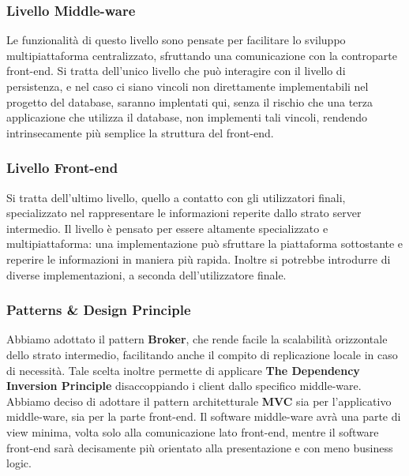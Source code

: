 \documentclass[a4paper]{article}
\begin{document}
\subsubsection{Livello Middle-ware}
Le funzionalità di questo livello sono pensate per facilitare lo sviluppo multipiattaforma centralizzato, sfruttando una comunicazione con la controparte front-end. Si tratta dell'unico livello che può interagire con il livello di persistenza, e nel caso ci siano vincoli non direttamente implementabili nel progetto del database, saranno implentati qui, senza il rischio che una terza applicazione che utilizza il database, non implementi tali vincoli, rendendo intrinsecamente più semplice la struttura del front-end.

\subsubsection{Livello Front-end}
Si tratta dell'ultimo livello, quello a contatto con gli utilizzatori finali, specializzato nel rappresentare le informazioni reperite dallo strato server intermedio. Il livello è pensato per essere altamente specializzato e multipiattaforma: una implementazione può sfruttare la piattaforma sottostante e reperire le informazioni in maniera più rapida. Inoltre si potrebbe introdurre di diverse implementazioni, a seconda dell'utilizzatore finale.\\


\subsubsection{Patterns \& Design Principle}
Abbiamo adottato il pattern \textbf{Broker}, che rende facile la scalabilità orizzontale dello strato intermedio, facilitando anche il compito di replicazione locale in caso di necessità. Tale scelta inoltre permette di applicare \textbf{The Dependency Inversion Principle} disaccoppiando i client dallo specifico middle-ware.\\Abbiamo deciso di adottare il pattern architetturale \textbf{MVC} sia per l'applicativo middle-ware, sia per la parte front-end. Il software middle-ware avrà una parte di view minima, volta solo alla comunicazione lato front-end, mentre il software front-end sarà decisamente più orientato alla presentazione e con meno business logic.

\end{document}
